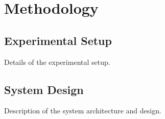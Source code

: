 \chapter{Methodology}

\section{Experimental Setup}

Details of the experimental setup.

\section{System Design}

Description of the system architecture and design.
